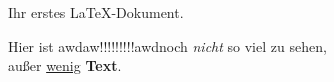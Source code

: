 \documentclass[a4paper,12pt]{article}
\begin{document}
\huge
Ihr erstes \LaTeX-Dokument.
\normalsize

Hier ist awdaw!!!!!!!!!awdnoch \textit{nicht} so viel zu sehen,\\
außer \underline{\small wenig} \textbf{Text}.
\end{document}
